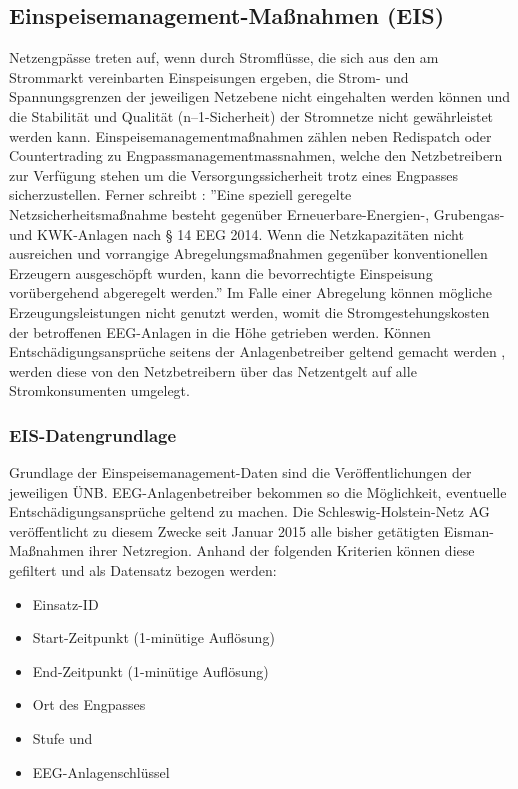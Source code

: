 \documentclass[onecolumn,10pt,titlepage]{article}
\begin{document}
\subsection{Einspeisemanagement-Maßnahmen (EIS)}
Netzengpässe treten auf, wenn durch Stromflüsse, die sich aus den am Strommarkt vereinbarten Einspeisungen ergeben, die Strom- und Spannungsgrenzen der jeweiligen Netzebene  nicht eingehalten werden können und die Stabilität und Qualität (n–1-Sicherheit) der Stromnetze nicht gewährleistet werden kann. Einspeisemanagementmaßnahmen zählen neben Redispatch oder Countertrading zu Engpassmanagementmassnahmen, welche den Netzbetreibern zur Verfügung stehen um die Versorgungssicherheit trotz eines Engpasses sicherzustellen. Ferner schreibt \cite{Zapf.2017}: ''Eine speziell geregelte Netzsicherheitsmaßnahme besteht gegenüber Erneuerbare-Energien-, Grubengas- und KWK-Anlagen nach § 14 EEG 2014. Wenn die Netzkapazitäten nicht ausreichen und vorrangige Abregelungsmaßnahmen gegenüber konventionellen Erzeugern ausgeschöpft wurden, kann die bevorrechtigte Einspeisung vorübergehend abgeregelt werden.'' Im Falle einer Abregelung können mögliche Erzeugungsleistungen nicht genutzt werden, womit die Stromgestehungskosten der betroffenen EEG-Anlagen in die Höhe getrieben werden. Können Entschädigungsansprüche seitens der Anlagenbetreiber geltend gemacht werden , werden diese von den Netzbetreibern über das Netzentgelt auf alle Stromkonsumenten umgelegt.
\subsubsection{EIS-Datengrundlage}
Grundlage der Einspeisemanagement-Daten sind die Veröffentlichungen der jeweiligen ÜNB. EEG-Anlagenbetreiber bekommen so die Möglichkeit, eventuelle Entschädigungsansprüche geltend zu machen. Die Schleswig-Holstein-Netz AG veröffentlicht zu diesem Zwecke seit Januar 2015 alle bisher getätigten Eisman-Maßnahmen ihrer Netzregion. Anhand der folgenden Kriterien können diese gefiltert und als Datensatz bezogen werden: \cite{SchleswigHolstenNetzAG.31.Januar2019}

\begin{itemize} 
	\item Einsatz-ID 
	\item Start-Zeitpunkt (1-minütige Auflösung)
	\item End-Zeitpunkt (1-minütige Auflösung)
	\item Ort des Engpasses
	\item Stufe und
	\item EEG-Anlagenschlüssel
\end{itemize}
\end{document}
